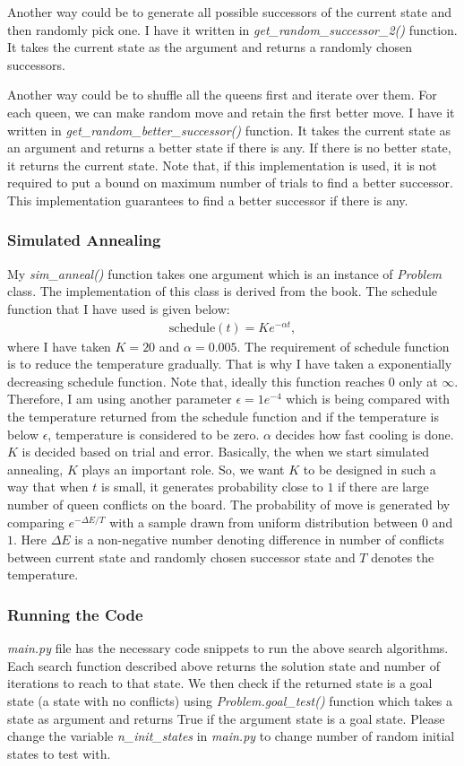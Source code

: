 Another way could be to generate all possible successors of the current state and then randomly pick one. I have it written in \textit{get\_random\_successor\_2()} function. It takes the current state as the argument and returns a randomly chosen successors.

Another way could be to shuffle all the queens first and iterate over them. For each queen, we can make random move and retain the first better move. I have it written in \textit{get\_random\_better\_successor()} function. It takes the current state as an argument and returns a better state if there is any. If there is no better state, it returns the current state. Note that, if this implementation is used, it is not required to put a bound on maximum number of trials to find a better successor. This implementation guarantees to find a better successor if there is any.
\subsubsection*{Simulated Annealing}
My \textit{sim\_anneal()} function takes one argument which is an instance of \textit{Problem} class. The implementation of this class is derived from the book. The schedule function that I have used is given below:
\begin{align*}
	\text{schedule}(t) = Ke^{-\alpha t},
\end{align*}
where I have taken $K=20$ and $\alpha=0.005$. The requirement of schedule function is to reduce the temperature gradually. That is why I have taken a exponentially decreasing schedule function. Note that, ideally this function reaches $0$ only at $\infty$. Therefore, I am using another parameter $\epsilon=1e^{-4}$ which is being compared with the temperature returned from the schedule function and if the temperature is below $\epsilon$, temperature is considered to be zero. $\alpha$ decides how fast cooling is done. $K$ is decided based on trial and error. Basically, the when we start simulated annealing, $K$ plays an important role. So, we want $K$ to be designed in such a way that when $t$ is small, it generates probability close to $1$ if there are large number of queen conflicts on the board. The probability of move is generated by comparing $e^{-\Delta E/T}$ with a sample drawn from uniform distribution between $0$ and $1$. Here $\Delta E$ is a non-negative number denoting difference in number of conflicts between current state and randomly chosen successor state and $T$ denotes the temperature.
\subsubsection*{Running the Code}
\textit{main.py} file has the necessary code snippets to run the above search algorithms. Each search function described above returns the solution state and number of iterations to reach to that state. We then check if the returned state is a goal state (a state with no conflicts) using \textit{Problem.goal\_test()} function which takes a state as argument and returns True if the argument state is a goal state. Please change the variable \textit{n\_init\_states} in \textit{main.py} to change number of random initial states to test with.
